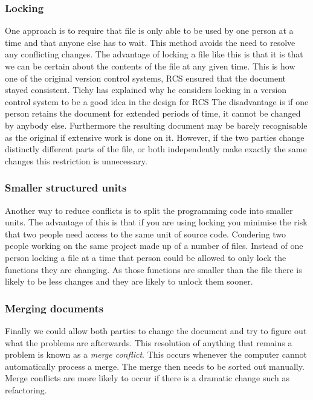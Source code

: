 \subsubsection{Locking}
One approach is to require that file is only able to be used by one person at a time and that anyone else has to wait. This method avoids the need to resolve any conflicting changes.  The advantage of locking a file like this is that it is that we can be certain about the contents of the file at any given time. This is how one of the original version control systems, RCS ensured that the document stayed consistent. Tichy has explained why he considers locking in a version control system to be a good idea in the design for RCS\cite{Tichy1982} The disadvantage is if one person retains the document for extended periods of time, it cannot be changed by anybody else. Furthermore the resulting document may be barely recognisable as the original if extensive work is done on it. However, if the two parties change distinctly different parts of the file, or both independently make exactly the same changes this restriction is unnecessary. 
\subsubsection{Smaller structured units}
Another way to reduce conflicts is to split the programming code into smaller units.  The advantage of this is that if you are using locking you minimise the risk that two people need access to the same unit of source code. Condering two people working on the same project made up of a number of files.  Instead of one person locking a file at a time that person could be allowed to only lock the functions they are changing. As those functions are smaller than the file there is likely to be less changes and they are likely to unlock them sooner.
\subsubsection{Merging documents}
Finally we could allow both parties to change the document and try to figure out what the problems are afterwards.  This resolution of anything that remains a problem is known as a \emph{merge conflict}. This occurs whenever the computer cannot automatically process a merge.  The merge then needs to be sorted out manually. Merge conflicts are more likely to occur if there is a dramatic change such as refactoring.

